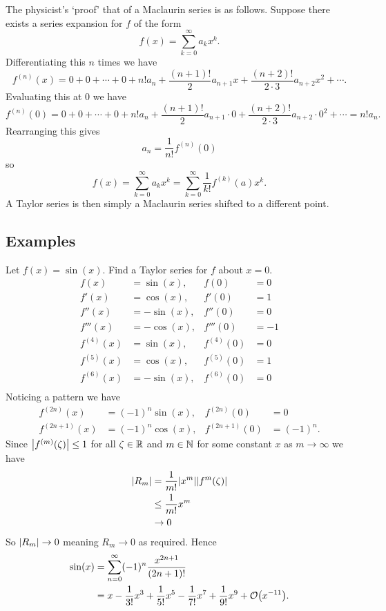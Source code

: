 The physicist's `proof' that of a Maclaurin series is as follows.
Suppose there exists a series expansion for \(f\) of the form
\[f(x) = \sum_{k=0}^{\infty} a_kx^k.\]
Differentiating this \(n\) times we have
\[f^{(n)}(x) = 0 + 0 + \dotsb + 0 + n!a_n + \frac{(n+1)!}{2}a_{n+1}x + \frac{(n + 2)!}{2\cdot 3}a_{n+2}x^2 + \dotsb.\]
Evaluating this at 0 we have
\[f^{(n)}(0) = 0 + 0 + \dotsb + 0 + n!a_n + \frac{(n + 1)!}{2}a_{n + 1}\cdot0 + \frac{(n + 2)!}{2\cdot 3}a_{n + 2}\cdot 0^2 + \dotsb = n!a_n.\]
Rearranging this gives
\[a_n = \frac{1}{n!}f^{(n)}(0)\]
so
\[f(x) = \sum_{k=0}^{\infty} a_kx^k = \sum_{k=0}^{\infty} \frac{1}{k!}f^{(k)}(a)x^k.\]
A Taylor series is then simply a Maclaurin series shifted to a different point.

\subsection{Examples}
Let \(f(x) = \sin(x)\).
Find a Taylor series for \(f\) about \(x = 0\).
\begin{align*}
    f(x) &= \sin(x), & f(0) &= 0\\
    f'(x) &= \cos(x), & f'(0) &= 1\\
    f''(x) &= -\sin(x), & f''(0) &= 0\\
    f'''(x) &= -\cos(x), & f'''(0) &= -1\\
    f^{(4)}(x) &= \sin(x), & f^{(4)}(0) &= 0\\
    f^{(5)}(x) &= \cos(x), & f^{(5)}(0) &= 1\\
    f^{(6)}(x) &= -\sin(x), & f^{(6)}(0) &= 0\\
\end{align*}
Noticing a pattern we have
\begin{align*}
    f^{(2n)}(x) &= (-1)^n\sin(x), & f^{(2n)}(0) &= 0\\
    f^{(2n+1)}(x) &= (-1)^n\cos(x), & f^{(2n+1)}(0) &= (-1)^n.
\end{align*}
Since \(\abs{f^{(m)}(\zeta)}\le 1\) for all \(\zeta\in\mathbb{R}\) and \(m\in\mathbb{N}\) for some constant \(x\) as \(m\to\infty\) we have
\begin{align*}
    \abs{R_m} &= \frac{1}{m!}\abs{x^m}\abs{f^{m}(\zeta)}\\
    &\le \frac{1}{m!}x^m\\
    &\to 0
\end{align*}
So \(\abs{R_m}\to 0\) meaning \(R_m\to 0\) as required.
Hence
\begin{align*}
    \sin(x) &= \sum_{n=0}^{\infty}(-1)^n\frac{x^{2n+1}}{(2n+1)!}\\
    &= x - \frac{1}{3!}x^3 + \frac{1}{5!}x^5 - \frac{1}{7!}x^7 + \frac{1}{9!}x^9 + \order{x^{-11}}.
\end{align*}

